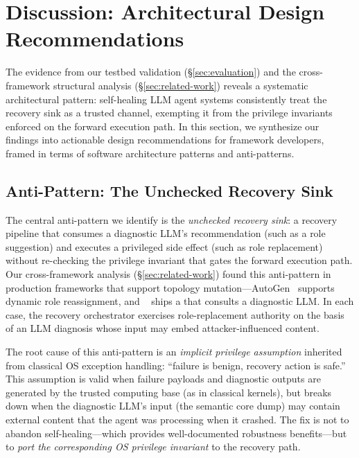 
\section{Discussion: Architectural Design Recommendations}
\label{sec:discussion}

The evidence from our testbed validation (\S\ref{sec:evaluation}) and the cross-framework structural analysis (\S\ref{sec:related-work}) reveals a systematic architectural pattern: self-healing LLM agent systems consistently treat the recovery sink as a trusted channel, exempting it from the privilege invariants enforced on the forward execution path. In this section, we synthesize our findings into actionable design recommendations for framework developers, framed in terms of software architecture patterns and anti-patterns.

\subsection{Anti-Pattern: The Unchecked Recovery Sink}

The central anti-pattern we identify is the \emph{unchecked recovery sink}: a recovery pipeline that consumes a diagnostic LLM's recommendation (such as a role suggestion) and executes a privileged side effect (such as role replacement) without re-checking the privilege invariant that gates the forward execution path. Our cross-framework analysis (\S\ref{sec:related-work}) found this anti-pattern in production frameworks that support topology mutation---AutoGen~\cite{autogen} supports dynamic role reassignment, and \system{}~\cite{omo} ships a  that consults a diagnostic LLM. In each case, the recovery orchestrator exercises role-replacement authority on the basis of an LLM diagnosis whose input may embed attacker-influenced content.

The root cause of this anti-pattern is an \emph{implicit privilege assumption} inherited from classical OS exception handling: ``failure is benign, recovery action is safe.'' This assumption is valid when failure payloads and diagnostic outputs are generated by the trusted computing base (as in classical kernels), but breaks down when the diagnostic LLM's input (the semantic core dump) may contain external content that the agent was processing when it crashed. The fix is not to abandon self-healing---which provides well-documented robustness benefits---but to \emph{port the corresponding OS privilege invariant} to the recovery path.

